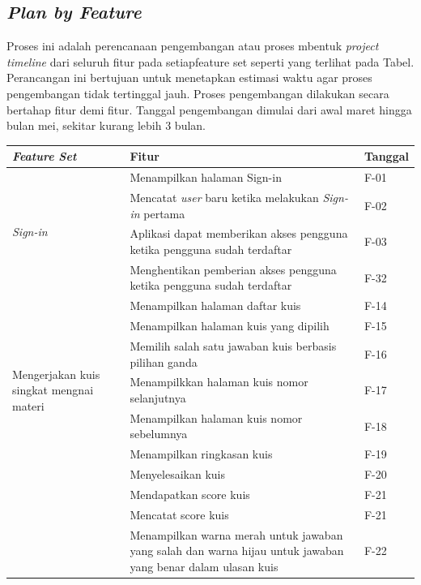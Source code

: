 \subsection{\textit{Plan by Feature}}
Proses ini adalah perencanaan pengembangan atau proses mbentuk \textit{project timeline} dari seluruh fitur pada setiapfeature set seperti yang terlihat pada Tabel.
Perancangan ini bertujuan untuk menetapkan estimasi waktu agar proses pengembangan tidak tertinggal jauh.
Proses pengembangan dilakukan secara bertahap fitur demi fitur. Tanggal pengembangan dimulai dari awal maret hingga bulan mei, sekitar kurang lebih 3 bulan.

\begin{table}[H]
	\begin{tabular}{|m{3cm}|p{}|p{2cm}|}
		\hline
		\centering\textbf{\textit{Feature Set}} & \centering\textbf{Fitur} & \multicolumn{1}{m{2cm}|}{\centering \textbf{Tanggal}} \\
		\hline
		\multirow{4}{2.5cm}{\textit{Sign-in}} &Menampilkan halaman Sign-in & F-01 \\
		\cline{2-3}
		 &Mencatat \textit{user} baru ketika melakukan \textit{Sign-in} pertama & F-02 \\
		\cline{2-3}
		 &Aplikasi dapat memberikan akses pengguna ketika pengguna sudah terdaftar& F-03 \\
		\hline
		\multirow{1}{2.5cm}{\textit{Log-Out}} &Menghentikan pemberian akses pengguna ketika pengguna sudah terdaftar& F-32 \\
		\hline
		\multirow{7}{2.5cm}{Mengerjakan kuis singkat mengnai materi} &Menampilkan halaman daftar kuis& F-14 \\
		\cline{2-3}
		&Menampilkan halaman kuis yang dipilih& F-15 \\
		\cline{2-3}
		&Memilih salah satu jawaban kuis berbasis pilihan ganda& F-16 \\
		\cline{2-3}
		&Menampilkkan halaman kuis nomor selanjutnya& F-17 \\
		\cline{2-3}
		&Menampilkan halaman kuis nomor sebelumnya& F-18 \\
		\cline{2-3}
		&Menampilkan ringkasan kuis& F-19 \\
		\cline{2-3}
		&Menyelesaikan kuis& F-20 \\
		\cline{2-3}
		&Mendapatkan score kuis& F-21 \\
		\cline{2-3}
		&Mencatat score kuis& F-21 \\
		\cline{2-3}
		&Menampilkan warna merah untuk jawaban yang salah dan warna hijau untuk jawaban yang benar dalam ulasan kuis& F-22 \\

\end{tabular}
\end{table}
